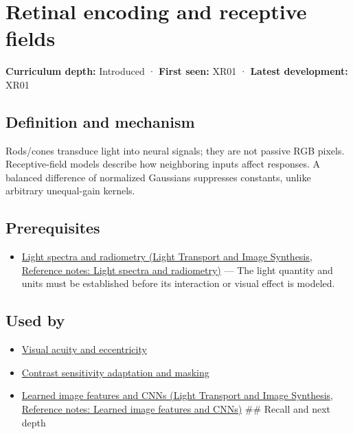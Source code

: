 \hypertarget{appendix-7281c15ac44a}{}\label{referencestart:appendix-7281c15ac44a}
\section{Retinal encoding and receptive fields}\label{appendix-7281c15ac44a-retinal-encoding-and-receptive-fields}

\textbf{Curriculum depth:} Introduced · \textbf{First seen:} XR01 · \textbf{Latest development:} XR01

\subsection{Definition and mechanism}\label{appendix-7281c15ac44a-definition-and-mechanism}

Rods/cones transduce light into neural signals; they are not passive RGB pixels. Receptive-field models describe how neighboring inputs affect responses. A balanced difference of normalized Gaussians suppresses constants, unlike arbitrary unequal-gain kernels.

\subsection{Prerequisites}\label{appendix-7281c15ac44a-prerequisites}

\begin{itemize}
\tightlist
\item
  \href{../04-Light-Transport-and-Image-Synthesis/main.pdf\#nameddest=appendix-215c2570199b}{Light spectra and radiometry (Light Transport and Image Synthesis, Reference notes: Light spectra and radiometry)} --- The light quantity and units must be established before its interaction or visual effect is modeled.
\end{itemize}

\subsection{Used by}\label{appendix-7281c15ac44a-used-by}

\begin{itemize}
\item
  \hyperref[appendix-b491fc48c54b]{Visual acuity and eccentricity}
\item
  \hyperref[appendix-b3aa9e8e01ad]{Contrast sensitivity adaptation and masking}
\item
  \href{../04-Light-Transport-and-Image-Synthesis/main.pdf\#nameddest=appendix-47c51ea026fb}{Learned image features and CNNs (Light Transport and Image Synthesis, Reference notes: Learned image features and CNNs)} \#\# Recall and next depth
\end{itemize}

